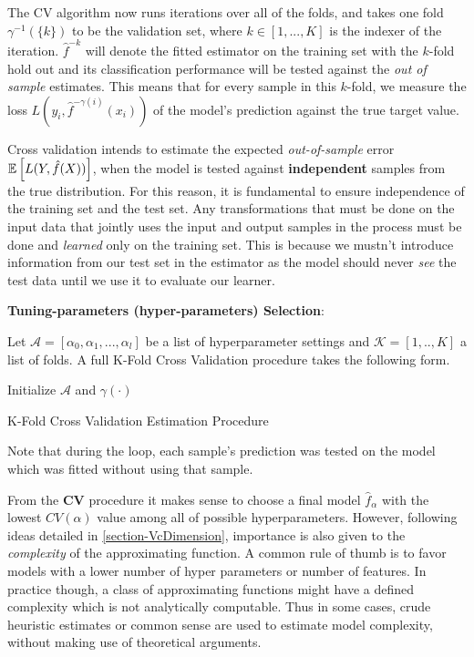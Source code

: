  The CV algorithm now runs iterations over all of the folds, and takes one fold $\gamma^{-1}(\{k\})$ to be the validation set, where $k \in [1,...,K]$ is the indexer of the iteration. $\hat{f}^{-k}$ will denote the fitted estimator on the training set with the $k$-fold hold out and its classification performance will be tested against the \textit{out of sample} estimates. This means that for every sample in this $k$-fold, we measure the loss $L(y_i, \hat{f}^{-\gamma(i)}(x_i))$ of the model's prediction against the true target value.

Cross validation intends to estimate the expected \textit{out-of-sample} error $\operatorname{\mathbb{E}} \left[  L(Y, \hat{f}(X)) \right]$, when the model is tested against \textbf{independent} samples from the true distribution. For this reason, it is fundamental to ensure independence of the training set and the test set. Any transformations that must be done on the input data that jointly uses the input and output samples in the process must be done and \textit{learned} only on the training set. This is because we mustn't introduce information from our test set in the estimator as the model should never \textit{see} the test data until we use it to evaluate our learner.

\textbf{Tuning-parameters (hyper-parameters) Selection}:

 Let $\mathcal{A} = [\alpha_0, \alpha_1,..., \alpha_l   ]$ be a list of hyperparameter settings and  $\mathcal{K} =[1,..,K]$ a list of folds.  A full K-Fold Cross Validation procedure takes the following form.

  \begin{algorithm}%
  \SetAlgoLined
  Initialize $\mathcal{A}$ and $\gamma(\cdot)$\;
  \caption{K-Fold Cross Validation Estimation Procedure}
 \end{algorithm}

Note that during the loop, each sample's prediction was tested on the model which was fitted without using that sample.

From the \textbf{CV} procedure it makes sense to choose a final  model $\hat{f}_\alpha$ with the lowest $CV(\alpha)$ value among all of possible hyperparameters. However, following ideas detailed in \ref{section-VcDimension}, importance is also given to the \textit{complexity} of the approximating function. A common rule of thumb is to favor models with a lower number of hyper parameters or number of features. In practice though, a class of approximating functions might have a defined complexity which is not analytically computable. Thus in some cases, crude heuristic estimates or common sense are used to estimate model complexity, without making use of theoretical arguments.

